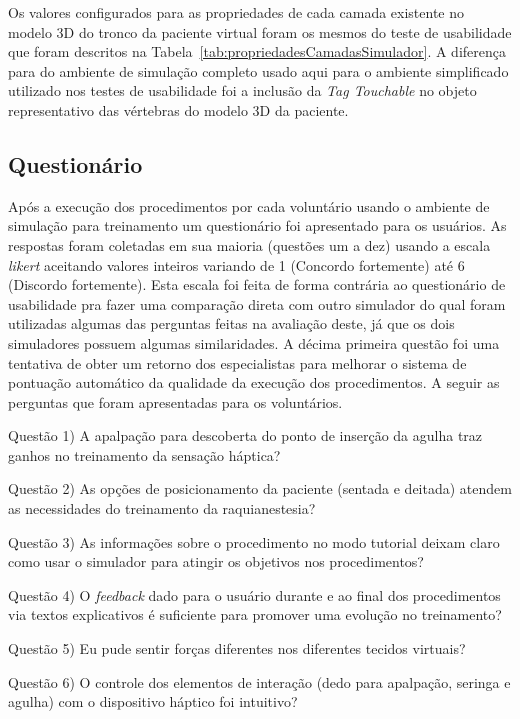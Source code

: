 Os valores configurados para as propriedades de cada camada existente no modelo 3D do tronco da paciente virtual foram os mesmos do teste de usabilidade que foram descritos na Tabela~\ref{tab:propriedadesCamadasSimulador}. A diferença para do ambiente de simulação completo usado aqui para o ambiente simplificado utilizado nos testes de usabilidade foi a inclusão da \textit{Tag Touchable} no objeto representativo das vértebras do modelo 3D da paciente. 

\subsection{Questionário}
\label{sec:questionarioEspecialistas}

Após a execução dos procedimentos por cada voluntário usando o ambiente de simulação para treinamento um questionário foi apresentado para os usuários. As respostas foram coletadas em sua maioria (questões um a dez) usando a escala \textit{likert} \cite{Norman2010} aceitando valores inteiros variando de 1 (Concordo fortemente) até 6 (Discordo fortemente). Esta escala foi feita de forma contrária ao questionário de usabilidade pra fazer uma comparação direta com outro simulador \cite{Farber2009} do qual foram utilizadas algumas das perguntas feitas na avaliação deste, já que os dois simuladores possuem algumas similaridades. A décima primeira questão foi uma tentativa de obter um retorno dos especialistas para melhorar o sistema de pontuação automático da qualidade da execução dos procedimentos. A seguir as perguntas que foram apresentadas para os voluntários.

Questão 1) A apalpação para descoberta do ponto de inserção da agulha traz ganhos no treinamento da sensação háptica?

Questão 2) As opções de posicionamento da paciente (sentada e deitada) atendem as necessidades do treinamento da raquianestesia?

Questão 3) As informações sobre o procedimento no modo tutorial deixam claro como usar o simulador para atingir os objetivos nos procedimentos?

Questão 4) O \textit{feedback} dado para o usuário durante e ao final dos procedimentos via textos explicativos é suficiente para promover uma evolução no treinamento?

Questão 5) Eu pude sentir forças diferentes nos diferentes tecidos virtuais?

Questão 6) O controle dos elementos de interação (dedo para apalpação, seringa e agulha) com o dispositivo háptico foi intuitivo?


